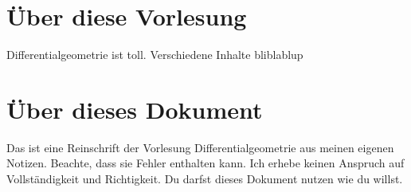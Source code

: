 \documentclass[../main.tex]{subfiles}
\begin{document}
\section*{Über diese Vorlesung}

Differentialgeometrie ist toll. Verschiedene Inhalte
bliblablup




\section*{Über dieses Dokument}
Das ist eine Reinschrift der Vorlesung Differentialgeometrie aus meinen eigenen Notizen. Beachte, dass sie Fehler enthalten kann. Ich erhebe keinen Anspruch auf Vollständigkeit und Richtigkeit.
Du darfst dieses Dokument nutzen wie du willst.
\end{document}
